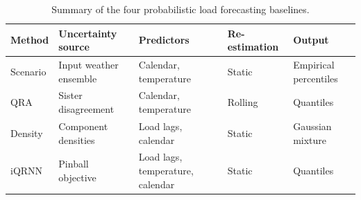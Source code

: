 \documentclass[10pt,journal,compsoc]{IEEEtran}
\begin{document}
\begin{table}[!t]
\caption{Summary of the four probabilistic load forecasting baselines.}
\label{tab:baselines}
\centering
\small
\setlength{\tabcolsep}{4pt}
\begin{tabular}{@{}lllll@{}}
\toprule
Method & Uncertainty source & Predictors & Re-estimation & Output \\
\midrule
Scenario \cite{xie2018temperature} & Input weather ensemble & Calendar, temperature
  & Static  & Empirical percentiles \\
QRA \cite{liu2017probabilistic}    & Sister disagreement    & Calendar, temperature
  & Rolling & Quantiles \\
Density \cite{li2020combining}     & Component densities    & Load lags, calendar
  & Static  & Gaussian mixture \\
iQRNN \cite{zhang2019improved}     & Pinball objective      & Load lags, temperature, calendar
  & Static  & Quantiles \\
\bottomrule
\end{tabular}
\end{table}



\end{document}

